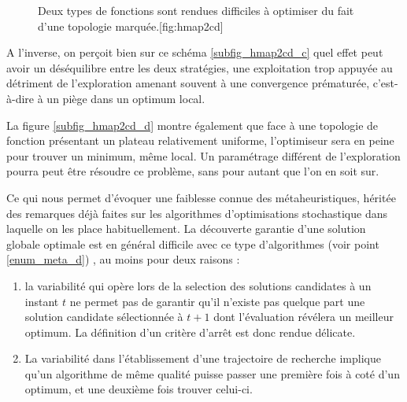 \begin{figure}[!htbp]
  \begin{sidecaption}[fortoc]{Deux types de fonctions sont rendues difficiles à optimiser du fait d'une topologie marquée.}[fig:hmap2cd]
  \centering
  \qquad
 \end{sidecaption}
\end{figure}

A l'inverse, on perçoit bien sur ce schéma \ref{subfig_hmap2cd_c} quel effet peut avoir un déséquilibre entre les deux stratégies, une exploitation trop appuyée au détriment de l'exploration amenant souvent à une convergence  prématurée, c'est-à-dire à un piège dans un optimum local. 

La figure \ref{subfig_hmap2cd_d} montre également que face à une topologie de fonction présentant un plateau relativement uniforme, l'optimiseur sera en peine pour trouver un minimum, même local. Un paramétrage différent de l'exploration pourra peut être résoudre ce problème, sans pour autant que l'on en soit sur. 

Ce qui nous permet d'évoquer une faiblesse connue des métaheuristiques, héritée des remarques déjà faites sur les algorithmes d'optimisations stochastique  dans laquelle on les place habituellement. La découverte garantie d'une solution globale optimale est en général difficile avec ce type d'algorithmes (voir point \ref{enum_meta_d}) , au moins pour deux raisons : 

\begin{enumerate}
\item la variabilité qui opère lors de la selection des solutions candidates à un instant $t$ ne permet pas de garantir qu'il n'existe pas quelque part une solution candidate sélectionnée à $t+1$ dont l'évaluation révélera un meilleur optimum. La définition d'un critère d'arrêt est donc rendue délicate.
\item La variabilité dans l'établissement d'une trajectoire de recherche implique qu'un algorithme de même qualité puisse passer une première fois à coté d'un optimum, et une deuxième fois trouver celui-ci. 
\end{enumerate}

